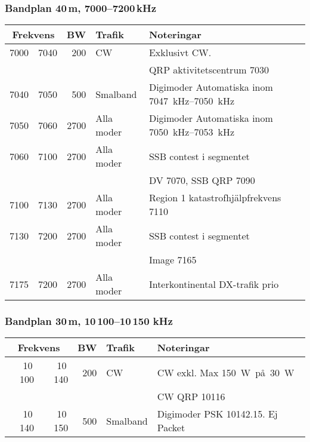 \subsubsection{Bandplan 40\,m, 7000--7200\,kHz}
\begin{tabular}{rrrll}
\multicolumn{2}{c}{\textbf{Frekvens}} & \textbf{BW} & \textbf{Trafik} & \textbf{Noteringar} \\ \hline

7000 & 7040 & 200  & CW         & Exklusivt CW.                                        \\
     &      &      &            & QRP aktivitetscentrum \SI{7030}{}                 \\ \hline
7040 & 7050 & 500  & Smalband   & Digimoder Automatiska inom \SIrange{7047}{7050}{kHz} \\ \hline
7050 & 7060 & 2700 & Alla moder & Digimoder Automatiska inom \SIrange{7050}{7053}{kHz} \\ \hline
7060 & 7100 & 2700 & Alla moder & SSB contest i segmentet                              \\
     &      &      &            & DV \SI{7070}{}, SSB QRP \SI{7090}{}            \\ \hline
7100 & 7130 & 2700 & Alla moder & Region 1 katastrofhjälpfrekvens \SI{7110}{}       \\ \hline
7130 & 7200 & 2700 & Alla moder & SSB contest i segmentet                              \\
     &      &      &            & Image \SI{7165}{}                                 \\ \hline
7175 & 7200 & 2700 & Alla moder & Interkontinental DX-trafik prio                      \\ \hline
\end{tabular}
\subsubsection{Bandplan 30\,m, 10\,100--10\,150 kHz}
\begin{tabular}{rrrll}
\multicolumn{2}{c}{\textbf{Frekvens}} & \textbf{BW} & \textbf{Trafik} & \textbf{Noteringar} \\ \hline

10\,100 & 10\,140 & 200 & CW       & CW exkl. Max \SI{150}{W på \SI{30}W}      \\
         &         &     &          & CW QRP \SI{10116}{}                      \\ \hline
10\,140 & 10\,150 & 500 & Smalband & Digimoder PSK \SI{10142,15}{}. Ej Packet \\ \hline
\end{tabular}

